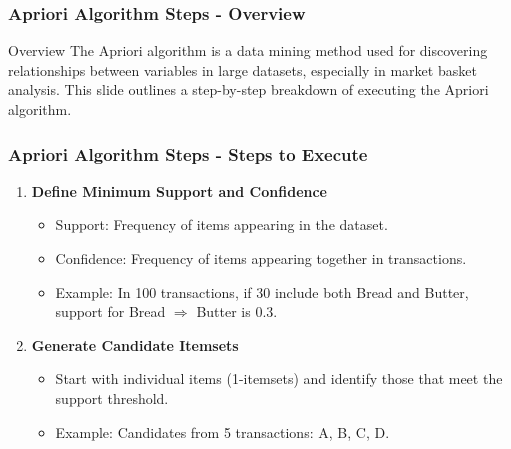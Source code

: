 \documentclass[aspectratio=169]{beamer}
\begin{document}
\begin{frame}[fragile]
    \frametitle{Apriori Algorithm Steps - Overview}
    \begin{block}{Overview}
        The Apriori algorithm is a data mining method used for discovering relationships between variables in large datasets, especially in market basket analysis.
        This slide outlines a step-by-step breakdown of executing the Apriori algorithm.
    \end{block}
\end{frame}

\begin{frame}[fragile]
    \frametitle{Apriori Algorithm Steps - Steps to Execute}
    \begin{enumerate}
        \item \textbf{Define Minimum Support and Confidence}
        \begin{itemize}
            \item Support: Frequency of items appearing in the dataset.
            \item Confidence: Frequency of items appearing together in transactions.
            \item Example: In 100 transactions, if 30 include both Bread and Butter, support for {Bread} $\Rightarrow$ {Butter} is 0.3.
        \end{itemize}
        
        \item \textbf{Generate Candidate Itemsets}
        \begin{itemize}
            \item Start with individual items (1-itemsets) and identify those that meet the support threshold.
            \item Example: Candidates from 5 transactions: {A}, {B}, {C}, {D}.
        \end{itemize}
    \end{enumerate}
\end{frame}
\end{document}
